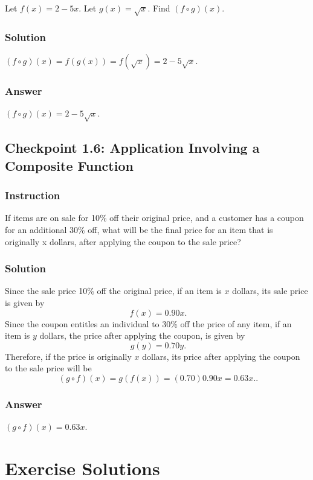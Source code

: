 \documentclass[11pt, letterpaper, oneside]{memoir}
\begin{document}
Let $ f(x) = 2 - 5x $. Let $ g(x) = \sqrt{x} $. Find $ (f \circ g)(x) $.

\subsubsection{Solution}

$ (f \circ g)(x) = f(g(x)) = f(\sqrt{x}) = 2 - 5\sqrt{x} $.

\subsubsection{Answer}

$ (f \circ g)(x) = 2 - 5\sqrt{x} $.

\subsection*{Checkpoint 1.6: Application Involving a Composite Function}

\subsubsection{Instruction}

If items are on sale for 10\% off their original price, and a customer has a coupon for an additional 30\% off, what will be the final price for an item that is originally x dollars, after applying the coupon to the sale price?

\subsubsection{Solution}

Since the sale price 10\% off the original price, if an item is $ x $ dollars, its sale price is given by
$$ \phantom{.}
f(x) = 0.90x
.$$
Since the coupon entitles an individual to 30\% off the price of any item, if an item is $ y $ dollars, the price after applying the coupon, is given by
$$ \phantom{.}
g(y) = 0.70y
.$$
Therefore, if the price is originally $ x $ dollars, its price after applying the coupon to the sale price will be
$$ \phantom{.}
(g \circ f)(x) = g(f(x)) = (0.70)0.90x = 0.63x.
.$$

\subsubsection{Answer}

$ (g \circ f)(x) = 0.63x $.

\section*{Exercise Solutions}
\end{document}
